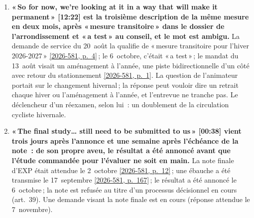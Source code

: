 \documentclass[11pt,letterpaper]{article}
\newcommand{\pagesurl}{https://openmobilitydata.github.io/Terrebonne-access-requests}
\newcommand{\cliptime}[1]{\textsf{\small[#1]}}
\newcommand{\pgl}[2]{\href{\pagesurl/2026-581/raw/01_emails_mandate_counts.pdf\#page=#1}{\textsf{\small[2026-581, p.~#2]}}}
\newcommand{\pg}[1]{\pgl{#1}{#1}}
\begin{document}
\begin{enumerate}[nosep]
  \item \begin{minipage}[t]{\linewidth}\textbf{«\,So for now, we're looking at it in a way that will make it permanent\,» \cliptime{12:22} est la troisième description de la même mesure en deux mois, après «\,mesure transitoire\,» dans le dossier de l'arrondissement et «\,a test\,» au conseil, et le mot est ambigu.} La demande de service du 20~août la qualifie de «\,mesure transitoire pour l'hiver 2026-2027\,» \pg{4}\,; le 6~octobre, c'était «\,a test\,»\,; le mandat du 13~août visait un aménagement à l'année, une piste bidirectionnelle d'un côté avec retour du stationnement \pg{1}. La question de l'animateur portait sur le changement hivernal\,; la réponse peut vouloir dire un retrait chaque hiver ou l'aménagement à l'année, et l'entrevue ne tranche pas. Le déclencheur d'un réexamen, selon lui~: un doublement de la circulation cycliste hivernale.\end{minipage}\vspace{0.35em}
  \item \begin{minipage}[t]{\linewidth}\textbf{«\,The final study… still need to be submitted to us\,» \cliptime{00:38} vient trois jours après l'annonce et une semaine après l'échéance de la note~: de son propre aveu, le résultat a été annoncé avant que l'étude commandée pour l'évaluer ne soit en main.} La note finale d'EXP était attendue le 2~octobre \pg{12}\,; une ébauche a été transmise le 17~septembre \pg{167}\,; le résultat a été annoncé le 6~octobre\,; la note est refusée au titre d'un processus décisionnel en cours (art.~39). Une demande visant la note finale est en cours (réponse attendue le 7~novembre).\end{minipage}\vspace{0.35em}

\end{enumerate}
\end{document}
